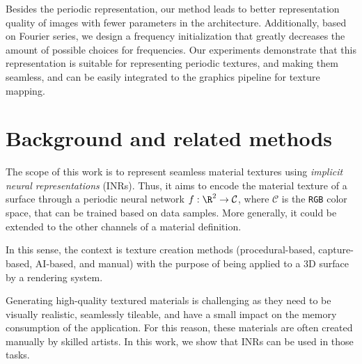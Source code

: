 


Besides the periodic representation, our method leads to better representation quality of images with fewer parameters in the architecture. Additionally, based on Fourier series, we design a frequency initialization that greatly decreases the amount of possible choices for frequencies. 
Our experiments demonstrate that this representation is suitable for representing periodic textures, and making them seamless, and can be easily integrated to the graphics pipeline for texture mapping.


\section{Background and related methods}

The scope of this work is to represent seamless material textures using \textit{implicit neural representations} (INRs). Thus, it aims to encode the material texture of a surface through a periodic neural network $f:\R^2\to \mathcal{C}$, where $\mathcal{C}$ is the \texttt{RGB} color space, that can be trained based on data samples. More generally, it could be extended to the other channels of a material definition.

In this sense, the context is texture creation methods (procedural-based, capture-based, AI-based, and manual) with the purpose of being applied to a 3D surface by a rendering system.

Generating high-quality textured materials is challenging as they need to be visually realistic, seamlessly tileable, and have a small impact on the memory consumption of the application. For this reason, these materials are often created manually by skilled artists.
In this work, we show that INRs can be used in those tasks.

